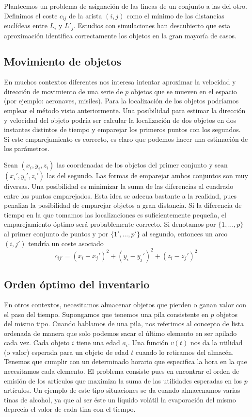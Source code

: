 \documentclass[twoside,a4paper,openright,12pt]{book}
\begin{document}
Planteemos un problema de asignación de las lineas de un conjunto a las del otro. Definimos el coste $c_{ij}$ de la arista $(i,j)$ como el mínimo de las distancias euclídeas entre $L_i$ y $L'_j$. Estudios con simulaciones han descubierto que esta aproximación identifica correctamente los objetos en la gran mayoría de casos.


\subsection{Movimiento de objetos}
En muchos contextos diferentes nos interesa intentar aproximar la velocidad y dirección de movimiento de una serie de $p$ objetos que se mueven en el espacio (por ejemplo: aeronaves, misiles). Para la localización de los objetos podríamos emplear el método visto anteriormente. Una posibilidad para estimar la dirección y velocidad del objeto podría ser calcular la localización de dos objetos en dos instantes distintos de tiempo y emparejar los primeros puntos con los segundos. Si este emparejamiento es correcto, es claro que podemos hacer una estimación de los parámetros. 

Sean $(x_i,y_i,z_i)$ las coordenadas de los objetos del primer conjunto y sean $(x_i',y_i',z_i')$ las del segundo. Las formas de emparejar ambos conjuntos son muy diversas. Una posibilidad es minimizar la suma de las diferencias al cuadrado entre los puntos emparejados. Esta idea se adecua bastante a la realidad, pues penaliza la posibilidad de emparejar objetos a gran distancia. Si la diferencia de tiempo en la que tomamos las localizaciones es suficientemente pequeña, el emparejamiento óptimo será probablemente correcto. Si denotamos por $\{1,\dotsc,p\}$ al primer conjunto de puntos y por $\{1',\dotsc,p'\}$ al segundo, entonces un arco $(i,j')$ tendría un coste asociado 
$$
c_{ij'} = (x_i-x_j')^2+(y_i-y_j')^2+(z_i-z_j')^2
$$

\subsection{Orden óptimo del inventario}
En otros contextos, necesitamos almacenar objetos que pierden o ganan valor con el paso del tiempo. Supongamos que tenemos una pila consistente en $p$ objetos del mismo tipo. Cuando hablamos de una pila, nos referimos al concepto de lista ordenada de manera que solo podemos sacar el último elemento en ser apilado cada vez. Cada objeto $i$ tiene una edad $a_i$. Una función $v(t)$ nos da la utilidad (o valor) esperada para un objeto de edad $t$ cuando lo retiramos del almacén. Tenemos que cumplir con un determinado horario que especifica la hora en la que necesitamos cada elemento. El problema consiste pues en encontrar el orden de emisión de los artículos que maximiza la suma de las utilidades esperadas en los $p$ artículos. Un ejemplo de este tipo situaciones se da cuando almacenamos varias tinas de alcohol, ya que al ser éste un líquido volátil la evaporación del mismo deprecia el valor de cada tina con el tiempo.
\end{document}
